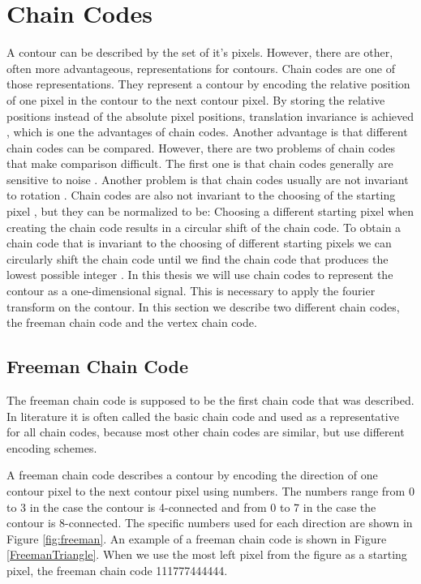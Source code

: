 \documentclass[thesis.tex]{subfiles}
\begin{document}
\section{Chain Codes} \label{chain_codes}
A contour can be described by the set of it's pixels. However, there are other, often more advantageous, representations for contours. Chain codes are one of those representations. They represent a contour by encoding the relative position of one pixel in the contour to the next contour pixel. By storing the relative positions instead of the absolute pixel positions, translation invariance is achieved \cite{yang2008su}, which is one the advantages of chain codes. Another advantage is that different chain codes can be compared. However, there are two problems of chain codes that make comparison difficult. The first one is that chain codes generally are sensitive to noise \cite{yang2008su}. Another problem is that chain codes usually are not invariant to rotation \cite{yang2008su}. Chain codes are also not invariant to the choosing of the starting pixel \cite{Ballard:1982:CV:578131}, but they can be normalized to be: Choosing a different starting pixel when creating the chain code results in a circular shift of the chain code. To obtain a chain code that is invariant to the choosing of different starting pixels we can circularly shift the chain code until we find the chain code that produces the lowest possible integer \cite{Ballard:1982:CV:578131}. In this thesis we will use chain codes to represent the contour as a one-dimensional signal. This is necessary to apply the fourier transform on the contour. In this section we describe two different chain codes, the freeman chain code and the vertex chain code.    

\subsection{Freeman Chain Code} \label{freeman}
The freeman chain code \cite{freeman} is supposed to be the first chain code that was described. In literature it is often called the basic chain code and used as a representative for all chain codes, because most other chain codes are similar, but use different encoding schemes. 

A freeman chain code describes a contour by encoding the direction of one contour pixel to the next contour pixel using numbers. The numbers range from 0 to 3 in the case the contour is 4-connected and from 0 to 7 in the case the contour is 8-connected. The specific numbers used for each direction are shown in Figure \ref{fig:freeman}. An example of a freeman chain code is shown in Figure \ref{FreemanTriangle}. When we use the most left pixel from the figure as a starting pixel, the freeman chain code 111777444444.
\end{document}

